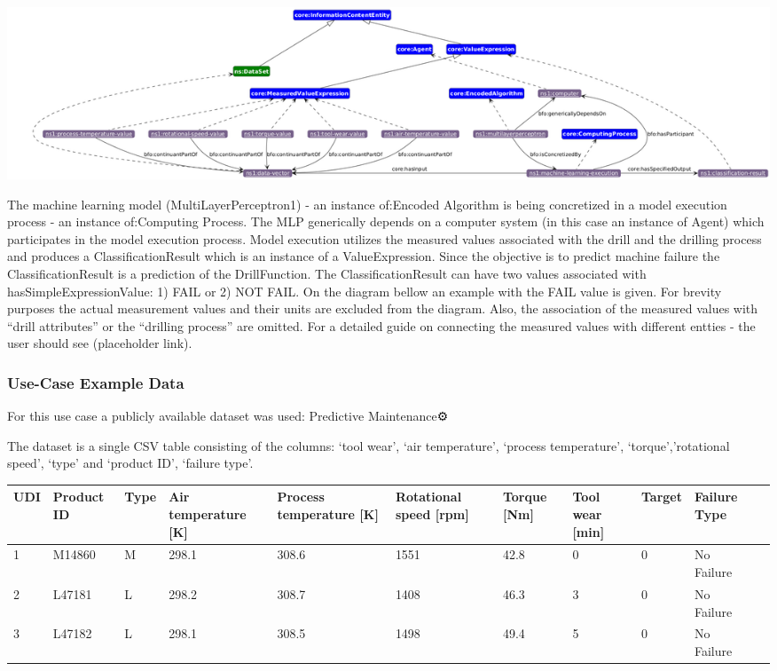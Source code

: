 \includegraphics[scale=0.23]{scenarios/algorithm-execution/images/algorithm-execution-usecase1.png}

The machine learning model (MultiLayerPerceptron1) - an instance of:Encoded Algorithm is being concretized in a model execution process - an instance of:Computing Process. The MLP generically depends on a computer system (in this case an instance of Agent) which participates in the model execution process. Model execution utilizes the measured values associated with the drill and the drilling process and produces a ClassificationResult which is an instance of a ValueExpression. Since the objective is to predict machine failure the ClassificationResult is a prediction of the DrillFunction. The ClassificationResult can have two values associated with hasSimpleExpressionValue: 1) FAIL or 2) NOT FAIL. On the diagram bellow an example with the FAIL value is given. For brevity purposes the actual measurement values and their units are excluded from the diagram. Also, the association of the measured values with “drill attributes” or the “drilling process” are omitted. For a detailed guide on connecting the measured values with different entties - the user should see (placeholder link).

\subsubsection*{Use-Case Example Data}

For this use case a publicly available dataset was used: Predictive Maintenance⚙️ 

The dataset is a single CSV table consisting of the columns: ‘tool wear’, ‘air temperature’, ‘process temperature’, ‘torque’,’rotational speed’, ‘type’ and ‘product ID’, ‘failure type’.

\begin{tabularx}{\textwidth}{|l|X|X|X|X|X|X|X|X|X|X|}
\hline
UDI & Product ID & Type & Air temperature {[}K{]} & Process temperature {[}K{]} & Rotational speed {[}rpm{]} & Torque {[}Nm{]} & Tool wear {[}min{]} & Target & Failure Type \\ \hline
1   & M14860     & M    & 298.1                   & 308.6                       & 1551                       & 42.8            & 0                   & 0      & No Failure   \\
2   & L47181     & L    & 298.2                   & 308.7                       & 1408                       & 46.3            & 3                   & 0      & No Failure   \\
3   & L47182     & L    & 298.1                   & 308.5                       & 1498                       & 49.4            & 5                   & 0      & No Failure   \\ \hline
\end{tabularx}

